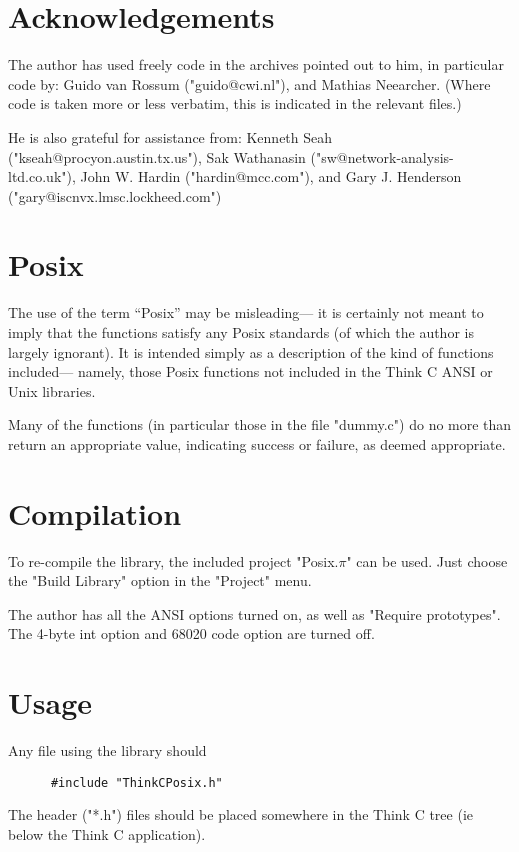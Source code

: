 \section{Acknowledgements}

The author has used freely code in the archives
pointed out to him,
in particular code by:
Guido van Rossum ("guido@cwi.nl"), and
Mathias Neearcher.
(Where code is taken more or less verbatim,
this is indicated in the relevant files.)

He is also grateful for assistance from:
Kenneth Seah ("kseah@procyon.austin.tx.us"),
Sak Wathanasin ("sw@network-analysis-ltd.co.uk"),
John W. Hardin ("hardin@mcc.com"), and
Gary J. Henderson ("gary@iscnvx.lmsc.lockheed.com")

\section{Posix}

The use of the term ``Posix'' may be misleading---%
it is certainly not meant to imply that the functions satisfy
any Posix standards
(of which the author is largely ignorant).
It is intended simply as a description
of the kind of functions included---%
namely, those Posix functions not included
in the Think C ANSI or Unix libraries.

Many of the functions
(in particular those in the file "dummy.c")
do no more than return an appropriate value,
indicating success or failure, as deemed appropriate.

\section{Compilation}

To re-compile the library,
the included project "Posix.$\pi$" can be used.
Just choose the "Build Library" option
in the "Project" menu.

The author has all the ANSI options turned on,
as well as "Require prototypes".
The 4-byte int option and 68020 code option
are turned off.

\section{Usage}

Any file using the library should
\begin{verbatim}
      #include "ThinkCPosix.h"
\end{verbatim}
The header ("*.h") files should be placed somewhere
in the Think C tree (ie below the Think C application).

